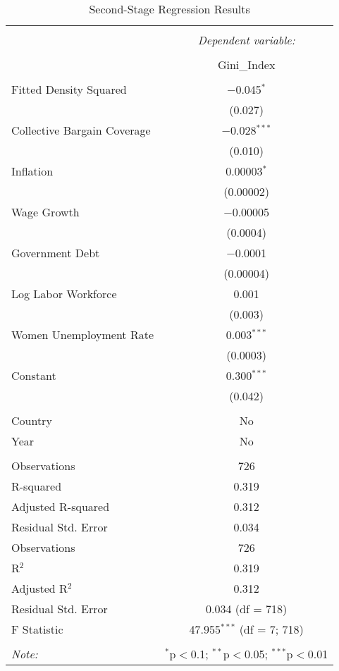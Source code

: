 
\begin{table}[!htbp] \centering 
  \caption{Second-Stage Regression Results} 
  \label{} 
\begin{tabular}{@{\extracolsep{5pt}}lc} 
\\[-1.8ex]\hline 
\hline \\[-1.8ex] 
 & \multicolumn{1}{c}{\textit{Dependent variable:}} \\ 
\cline{2-2} 
\\[-1.8ex] & Gini\_Index \\ 
\hline \\[-1.8ex] 
 Fitted Density Squared & $-$0.045$^{*}$ \\ 
  & (0.027) \\ 
  Collective Bargain Coverage & $-$0.028$^{***}$ \\ 
  & (0.010) \\ 
  Inflation & 0.00003$^{*}$ \\ 
  & (0.00002) \\ 
  Wage Growth & $-$0.00005 \\ 
  & (0.0004) \\ 
  Government Debt & $-$0.0001 \\ 
  & (0.00004) \\ 
  Log Labor Workforce & 0.001 \\ 
  & (0.003) \\ 
  Women Unemployment Rate & 0.003$^{***}$ \\ 
  & (0.0003) \\ 
  Constant & 0.300$^{***}$ \\ 
  & (0.042) \\ 
 \hline \\[-1.8ex] 
Country & No \\ 
Year & No \\ 
\hline \\[-1.8ex] 
Observations & 726 \\ 
R-squared & 0.319 \\ 
Adjusted R-squared & 0.312 \\ 
Residual Std. Error & 0.034 \\ 
Observations & 726 \\ 
R$^{2}$ & 0.319 \\ 
Adjusted R$^{2}$ & 0.312 \\ 
Residual Std. Error & 0.034 (df = 718) \\ 
F Statistic & 47.955$^{***}$ (df = 7; 718) \\ 
\hline 
\hline \\[-1.8ex] 
\textit{Note:}  & \multicolumn{1}{r}{$^{*}$p$<$0.1; $^{**}$p$<$0.05; $^{***}$p$<$0.01} \\ 
\end{tabular} 
\end{table} 
